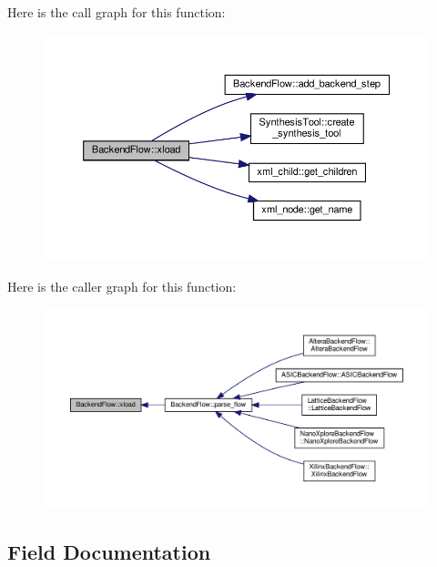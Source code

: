 Here is the call graph for this function\+:
\nopagebreak
\begin{figure}[H]
\begin{center}
\leavevmode
\includegraphics[width=350pt]{da/d75/classBackendFlow_a4cda12a4fef49b04b549029e69ff4551_cgraph}
\end{center}
\end{figure}
Here is the caller graph for this function\+:
\nopagebreak
\begin{figure}[H]
\begin{center}
\leavevmode
\includegraphics[width=350pt]{da/d75/classBackendFlow_a4cda12a4fef49b04b549029e69ff4551_icgraph}
\end{center}
\end{figure}


\subsection{Field Documentation}
\mbox{\label{classBackendFlow_a880b32084d564aa2e072088175270031}} 
